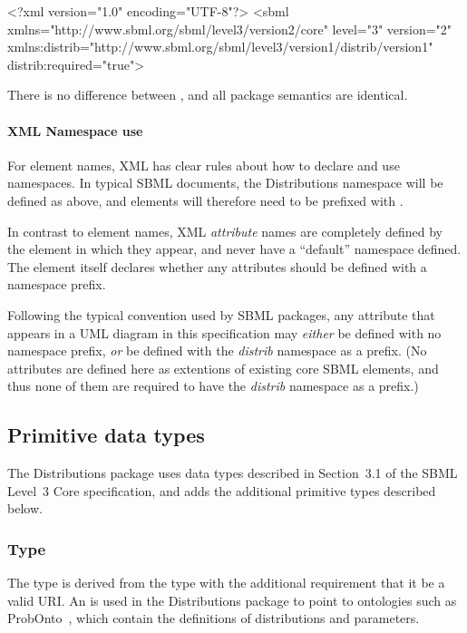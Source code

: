 \documentclass[draftspec]{sbmlpkgspec}
\newcommand{\fixttspace}{\hspace*{1pt}}
\newcommand{\sbmlthreecore}{SBML Level~3 Core\xspace}
\newcommand{\distrib}{Distributions\xspace}
\begin{document}
\begin{example}
<?xml version="1.0" encoding="UTF-8"?>
<sbml xmlns="http://www.sbml.org/sbml/level3/version2/core" level="3" version="2"
      xmlns:distrib="http://www.sbml.org/sbml/level3/version1/distrib/version1"
      distrib:required="true">
\end{example}

There is no difference between , and all package semantics are identical.

\paragraph{XML Namespace use}

For element names, XML has clear rules about how to declare and use namespaces.  In typical SBML documents, the \distrib namespace will be defined as above, and elements will therefore need to be prefixed with .

In contrast to element names, XML \emph{attribute} names are completely defined by the element in which they appear, and never have a ``default'' namespace defined. The element itself declares whether any attributes should be defined with a namespace prefix.

Following the typical convention used by SBML packages, any attribute that appears in a UML diagram in this specification may \emph{either} be defined with no namespace prefix, \emph{or} be defined with the \emph{distrib} namespace as a prefix.  (No attributes are defined here as extentions of existing core SBML elements, and thus none of them are required to have the \emph{distrib} namespace as a prefix.)


\subsection{Primitive data types}
\label{new-primitive-types}

The \distrib package uses data types described in Section~3.1 of the \sbmlthreecore specification, and adds the additional primitive types described below.

\subsubsection{Type \fixttspace{}}
\label{sec:primtype-externalref}

The type  is derived from the type  with the additional requirement that it be a valid URI.  An  is used in the \distrib package to point to ontologies such as ProbOnto~\citep{swat:2016}, which contain the definitions of distributions and parameters.
\end{document}
